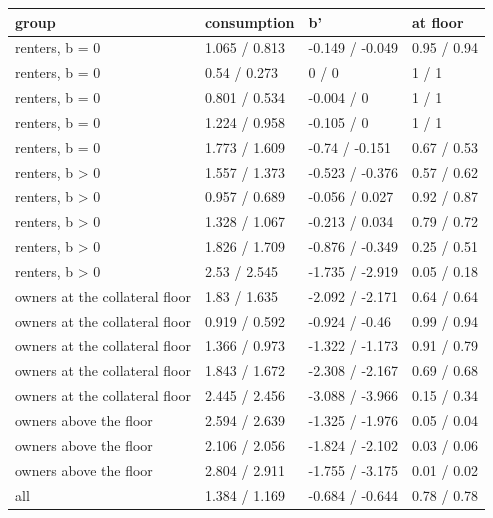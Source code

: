 \begingroup\small
\setlength{\tabcolsep}{3pt}
\renewcommand{\arraystretch}{1.04}
\begin{tabularx}{\linewidth}{XXXX}
\toprule
group & consumption & b' & at floor \\
\midrule
renters, b = 0 & 1.065 / 0.813 & -0.149 / -0.049 & 0.95 / 0.94 \\
renters, b = 0 & 0.54 / 0.273 & 0 / 0 & 1 / 1 \\
renters, b = 0 & 0.801 / 0.534 & -0.004 / 0 & 1 / 1 \\
renters, b = 0 & 1.224 / 0.958 & -0.105 / 0 & 1 / 1 \\
renters, b = 0 & 1.773 / 1.609 & -0.74 / -0.151 & 0.67 / 0.53 \\
renters, b \textgreater{} 0 & 1.557 / 1.373 & -0.523 / -0.376 & 0.57 / 0.62 \\
renters, b \textgreater{} 0 & 0.957 / 0.689 & -0.056 / 0.027 & 0.92 / 0.87 \\
renters, b \textgreater{} 0 & 1.328 / 1.067 & -0.213 / 0.034 & 0.79 / 0.72 \\
renters, b \textgreater{} 0 & 1.826 / 1.709 & -0.876 / -0.349 & 0.25 / 0.51 \\
renters, b \textgreater{} 0 & 2.53 / 2.545 & -1.735 / -2.919 & 0.05 / 0.18 \\
owners at the collateral floor & 1.83 / 1.635 & -2.092 / -2.171 & 0.64 / 0.64 \\
owners at the collateral floor & 0.919 / 0.592 & -0.924 / -0.46 & 0.99 / 0.94 \\
owners at the collateral floor & 1.366 / 0.973 & -1.322 / -1.173 & 0.91 / 0.79 \\
owners at the collateral floor & 1.843 / 1.672 & -2.308 / -2.167 & 0.69 / 0.68 \\
owners at the collateral floor & 2.445 / 2.456 & -3.088 / -3.966 & 0.15 / 0.34 \\
owners above the floor & 2.594 / 2.639 & -1.325 / -1.976 & 0.05 / 0.04 \\
owners above the floor & 2.106 / 2.056 & -1.824 / -2.102 & 0.03 / 0.06 \\
owners above the floor & 2.804 / 2.911 & -1.755 / -3.175 & 0.01 / 0.02 \\
all & 1.384 / 1.169 & -0.684 / -0.644 & 0.78 / 0.78 \\
\bottomrule
\end{tabularx}
\endgroup
